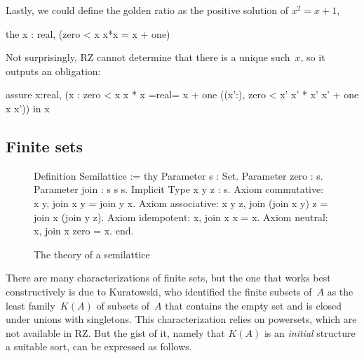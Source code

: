 Lastly, we could define the golden ratio as the positive solution of
$x^2 = x + 1$,
%
\begin{source}
the x : real, (zero < x \iAnd x*x = x + one)
\end{source}
%
Not surprisingly, RZ cannot determine that there is a unique such~$x$,
so it outputs an obligation:
%
\begin{source}
assure x:real,
  (x :  \iAnd zero < x \iAnd x * x =real= x + one \iAnd
    (\iForall (x':),  zero < x' \iAnd x' * x'  x' + one \iTo x  x'))
  in x
\end{source}
\fi %

\iflong
\subsection{Finite sets}
\label{sec:finite-sets}

\begin{figure}[b]
\begin{source}
Definition Semilattice :=
thy
  Parameter s : Set.
  Parameter zero : s.
  Parameter join : s \iTo s \iTo s.
  Implicit Type x y z : s.
  Axiom commutative: \iForall x y,   join x y = join y x.
  Axiom associative: \iForall x y z, join (join x y) z = join x (join y z).
  Axiom idempotent:  \iForall x,     join x x = x.
  Axiom neutral:     \iForall x,     join x zero = x.
end.
\end{source}
\caption{The theory of a semilattice}
\label{fig:semilattice}
\end{figure}

\iflong
There are many characterizations of finite sets, but the one that
works best constructively is due to Kuratowski, who identified the
finite subsets of~$A$ as the least family~$K(A)$ of subsets of~$A$
that contains the empty set and is closed under unions with
singletons. This characterization relies on powersets, which are not
available in RZ. But the gist of it, namely that $K(A)$ is an
\emph{initial} structure a suitable sort, can be expressed as follows.

